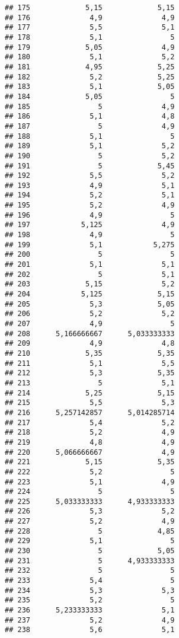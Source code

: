 \documentclass[
]{article}
\begin{document}
\begin{verbatim}
## 175             5,15             5,15
## 176              4,9              4,9
## 177              5,5              5,1
## 178              5,1                5
## 179             5,05              4,9
## 180              5,1              5,2
## 181             4,95             5,25
## 182              5,2             5,25
## 183              5,1             5,05
## 184             5,05                5
## 185                5              4,9
## 186              5,1              4,8
## 187                5              4,9
## 188              5,1                5
## 189              5,1              5,2
## 190                5              5,2
## 191                5             5,45
## 192              5,5              5,2
## 193              4,9              5,1
## 194              5,2              5,1
## 195              5,2              4,9
## 196              4,9                5
## 197            5,125              4,9
## 198              4,9                5
## 199              5,1            5,275
## 200                5                5
## 201              5,1              5,1
## 202                5              5,1
## 203             5,15              5,2
## 204            5,125             5,15
## 205              5,3             5,05
## 206              5,2              5,2
## 207              4,9                5
## 208      5,166666667      5,033333333
## 209              4,9              4,8
## 210             5,35             5,35
## 211              5,1              5,5
## 212              5,3             5,35
## 213                5              5,1
## 214             5,25             5,15
## 215              5,5              5,3
## 216      5,257142857      5,014285714
## 217              5,4              5,2
## 218              5,2              4,9
## 219              4,8              4,9
## 220      5,066666667              4,9
## 221             5,15             5,35
## 222              5,2                5
## 223              5,1              4,9
## 224                5                5
## 225      5,033333333      4,933333333
## 226              5,3              5,2
## 227              5,2              4,9
## 228                5             4,85
## 229              5,1                5
## 230                5             5,05
## 231                5      4,933333333
## 232                5                5
## 233              5,4                5
## 234              5,3              5,3
## 235              5,2                5
## 236      5,233333333              5,1
## 237              5,2              4,9
## 238              5,6              5,1

\end{verbatim}
\end{document}
